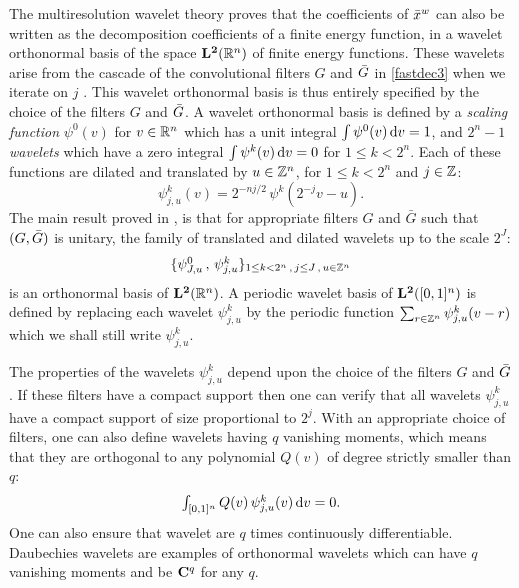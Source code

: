 \documentclass{article}
\begin{document}
The multiresolution wavelet theory \cite{mallat1999wavelet,Meyer:92c} proves
that the coefficients of ${\bar x}^w$ can also be written as the decomposition
coefficients of a finite energy function, in a wavelet orthonormal basis of the
space ${\bf L^2}(\mathbb R^n)$ of finite energy functions.  These wavelets arise from the
cascade of the convolutional filters $G$ and ${\bar {G}}$ in \eqref{fastdec3} when we
iterate on $j$ \cite{mallat1999wavelet}.  This wavelet orthonormal basis is thus
entirely specified by the choice of the filters $G$ and ${\bar {G}}$.  A wavelet
orthonormal basis is defined by a \emph{scaling function} $\psi^0 (v)$ for
$v \in \mathbb R^n$ which has a unit integral $\int {\psi^0 (v)} \,\mathrm{d} v = 1$, and $2^n-1$
\emph{wavelets} which have a zero integral $\int \psi^k(v)\, \mathrm{d} v = 0$ for
$1 \leq k < 2^n$.  Each of these functions are dilated and translated by
$u \in \mathbb Z^n$, for $1 \leq k <2^n$ and $j \in \mathbb Z$:
\begin{equation}
  \label{wavensdof}
\psi^k_{j,u} (v) = 2^{- nj/2}\, \psi^k (2^{-j} v - u).    
\end{equation}
The main result  proved in \cite{mallat1999wavelet,Meyer:92c},
is that for appropriate filters $G$ and $\bar G$ such that
$(G,{\bar {G}})$ is unitary, 
the family of translated and dilated wavelets
up to the scale $2^J$:
\begin{equation}
  \label{waveletbasis}
  \textstyle{
    \{ \psi^0_{J,u}\,,\,\psi^k_{j,u}  \}_{1 \leq k < 2^n\,,\,j \leq J \,,\,u \in \mathbb Z^n}
    }
\end{equation}
is an orthonormal basis of ${\bf L^2}(\mathbb R^n)$.
A periodic wavelet basis of ${\bf L^2}([0,1]^n)$ is defined
by replacing each  wavelet $\psi^k_{j,u}$ by the periodic function
$\sum_{r \in \mathbb Z^n} \psi^k_{j,u}(v- r)$ which we shall still
write $\psi^k_{j,u}$. 

The properties of the wavelets $\psi^k_{j,u}$ depend upon the choice of the
filters $G$ and ${\bar {G}}$. If these filters have a compact support then one can
verify \cite{mallat1999wavelet} 
that all wavelets $\psi^k_{j,u}$ have a compact support of size proportional
to $2^j$.
With an appropriate choice of filters, one can also define wavelets having
$q$ vanishing moments, which means that they are orthogonal to any polynomial $Q(v)$ of degree strictly smaller than $q$:
\[
  \textstyle{
    \int_{[0,1]^n} Q(v)\,\psi_{j,u}^k (v)\, \mathrm{d}v = 0 .
    }
\]
One can also ensure that wavelet are $q$ times continuously differentiable.
Daubechies wavelets \cite{mallat1999wavelet} are examples of orthonormal wavelets which can have $q$ vanishing moments and be ${\bf C}^q$ for any $q$.
\end{document}
